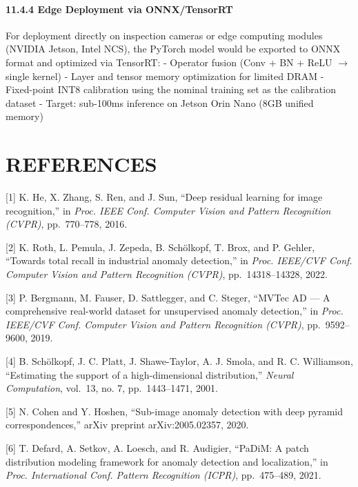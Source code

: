 \documentclass[12pt, a4paper, oneside]{report}
\begin{document}
\subsubsection{11.4.4 Edge Deployment via ONNX/TensorRT}\label{edge-deployment-via-onnxtensorrt}

For deployment directly on inspection cameras or edge computing modules (NVIDIA Jetson, Intel NCS), the PyTorch model would be exported to ONNX format and optimized via TensorRT: - Operator fusion (Conv + BN + ReLU $\rightarrow$ single kernel) - Layer and tensor memory optimization for limited DRAM - Fixed-point INT8 calibration using the nominal training set as the calibration dataset - Target: sub-100ms inference on Jetson Orin Nano (8GB unified memory)

\bigskip\noindent\hrulefill\bigskip

\chapter*{REFERENCES}
\label{references}

{[}1{]} K. He, X. Zhang, S. Ren, and J. Sun, ``Deep residual learning for image recognition,'' in \emph{Proc. IEEE Conf. Computer Vision and Pattern Recognition (CVPR)}, pp.~770--778, 2016.

{[}2{]} K. Roth, L. Pemula, J. Zepeda, B. Schölkopf, T. Brox, and P. Gehler, ``Towards total recall in industrial anomaly detection,'' in \emph{Proc. IEEE/CVF Conf. Computer Vision and Pattern Recognition (CVPR)}, pp.~14318--14328, 2022.

{[}3{]} P. Bergmann, M. Fauser, D. Sattlegger, and C. Steger, ``MVTec AD --- A comprehensive real-world dataset for unsupervised anomaly detection,'' in \emph{Proc. IEEE/CVF Conf. Computer Vision and Pattern Recognition (CVPR)}, pp.~9592--9600, 2019.

{[}4{]} B. Schölkopf, J. C. Platt, J. Shawe-Taylor, A. J. Smola, and R. C. Williamson, ``Estimating the support of a high-dimensional distribution,'' \emph{Neural Computation}, vol.~13, no. 7, pp.~1443--1471, 2001.

{[}5{]} N. Cohen and Y. Hoshen, ``Sub-image anomaly detection with deep pyramid correspondences,'' arXiv preprint arXiv:2005.02357, 2020.

{[}6{]} T. Defard, A. Setkov, A. Loesch, and R. Audigier, ``PaDiM: A patch distribution modeling framework for anomaly detection and localization,'' in \emph{Proc. International Conf. Pattern Recognition (ICPR)}, pp.~475--489, 2021.
\end{document}
